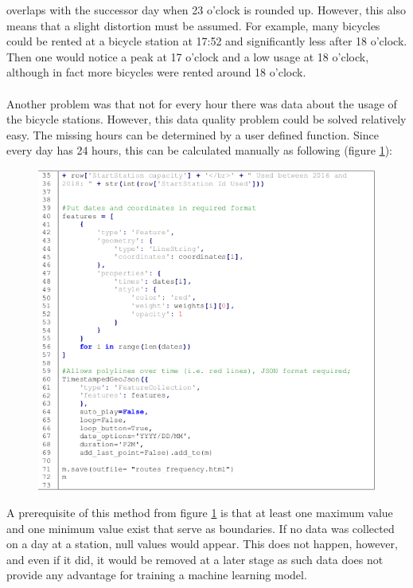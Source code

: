 overlaps with the successor day when 23 o'clock is rounded up. However, this also means that a
slight distortion must be assumed. For example, many bicycles could be rented at a bicycle station
at 17:52 and significantly less after 18 o'clock. Then one would notice a peak at 17 o'clock and a
low usage at 18 o'clock, although in fact more bicycles were rented around 18 o'clock.\\\\
Another problem was that not for every hour there was data about the usage of the bicycle stations.
However, this data quality problem could be solved relatively easy. The missing hours can be
determined by a user defined function. Since every day has 24 hours, this can be calculated
manually as following (figure \ref{fig:listing6}):
\begin{figure}[H]
\hspace{-1.6cm}
\includegraphics[width=1.2\textwidth]{img/listing2}\label{fig:listing6}
\label{fig:listing6}
\end{figure}
A prerequisite of this method from figure \ref{fig:listing6} is that at least one maximum value and one minimum
value exist that serve as boundaries. If no data was collected on a day at a station, null values
would appear. This does not happen, however, and even if it did, it would be removed at a later
stage as such data does not provide any advantage for training a machine learning model.\\\\
